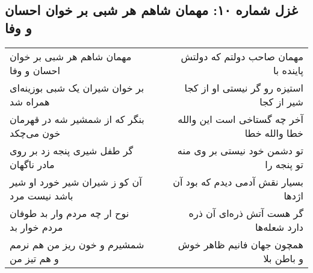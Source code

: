 \begin{center}
\section*{غزل شماره ۱۰: مهمان شاهم هر شبی بر خوان احسان و وفا}
\label{sec:0010}
\begin{longtable}{l p{0.5cm} r}
مهمان شاهم هر شبی بر خوان احسان و وفا
&&
مهمان صاحب دولتم که دولتش پاینده با
\\
بر خوان شیران یک شبی بوزینه‌ای همراه شد
&&
استیزه رو گر نیستی او از کجا شیر از کجا
\\
بنگر که از شمشیر شه در قهرمان خون می‌چکد
&&
آخر چه گستاخی است این والله خطا والله خطا
\\
گر طفل شیری پنجه زد بر روی مادر ناگهان
&&
تو دشمن خود نیستی بر وی منه تو پنجه را
\\
آن کو ز شیران شیر خورد او شیر باشد نیست مرد
&&
بسیار نقش آدمی دیدم که بود آن اژدها
\\
نوح ار چه مردم وار بد طوفان مردم خوار بد
&&
گر هست آتش ذره‌ای آن ذره دارد شعله‌ها
\\
شمشیرم و خون ریز من هم نرمم و هم تیز من
&&
همچون جهان فانیم ظاهر خوش و باطن بلا
\\
\end{longtable}
\end{center}
